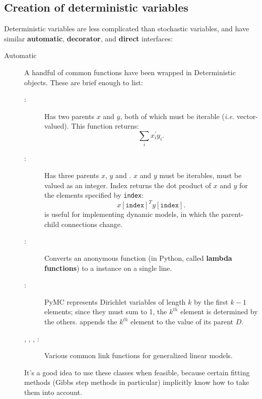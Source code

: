\subsection*{Creation of deterministic variables}
Deterministic variables are less complicated than stochastic variables, and have similar \textbf{automatic}, \textbf{decorator}, and \textbf{direct} interfaces:
\begin{description}
   \item[Automatic] A handful of common functions have been wrapped in Deterministic objects. These are brief enough to list:
   \begin{description}
      \item[:] Has two parents $x$ and $y$, both of which must be iterable (\emph{i.e.} vector-valued). This function returns:
      \[
      \sum_i x_i^{\prime} y_i.
      \]
      \item[:] Has three parents $x$, $y$ and . $x$ and $y$ must be iterables,  must be valued as an integer. Index returns the dot product of $x$ and $y$ for the elements specified by \texttt{index}:
      \[
      x[\mathtt{index}]^T y[\mathtt{index}].
      \]
       is useful for implementing dynamic models, in which the parent-child connections change.
      \item[:] Converts an anonymous function (in Python, called \textbf{lambda functions}) to a  instance on a single line.
      \item[:] PyMC represents Dirichlet variables of length $k$ by the first $k-1$ elements; since they must sum to 1, the $k^{th}$ element is determined by the others.  appends the $k^{th}$ element to the value of its parent $D$.      
      \item[, , , :] Various common link functions for generalized linear models.
   \end{description}
   It's a good idea to use these classes when feasible, because certain fitting methods (Gibbs step methods in particular) implicitly know how to take them into account.


\end{description}
